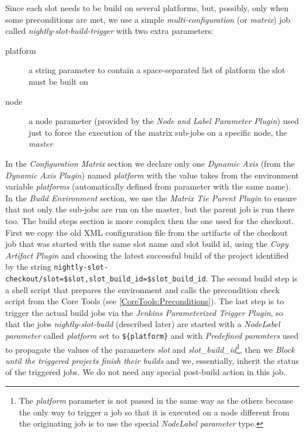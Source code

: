 \documentclass{lhcbnote}
\begin{document}
Since each slot needs to be build on several platforms, but, possibly, only when
some preconditions are met, we use a simple \emph{multi-configuration} (or
\emph{matrix}) job called \emph{nightly-slot-build-trigger} with two extra
parameters:
\begin{description}
  \item[platform] a string parameter to contain a space-separated list of
platform the slot must be built on
  \item[node] a node parameter (provided by the \emph{Node and Label Parameter
Plugin}) used just to force the execution of the matrix sub-jobs on a specific
node, the \emph{master}
\end{description}
In the \emph{Configuration Matrix} section we declare only one \emph{Dynamic
Axis} (from the \emph{Dynamic Axis Plugin}) named \emph{platform} with the value
takes from the environment variable \emph{platforms} (automatically defined from
parameter with the same name).  In the \emph{Build Environment} section, we use
the \emph{Matrix Tie Parent Plugin} to ensure that not only the sub-jobs are run
on the master, but the parent job is run there too.  The build steps section is
more complex then the one used for the checkout.  First we copy the old XML
configuration file from the artifacts of the checkout job that was started with
the same slot name and slot build id, using the \emph{Copy Artifact Plugin} and
choosing the latest successful build of the project identified by the string
\verb|nightly-slot-checkout/slot=$slot,slot_build_id=$slot_build_id|.  The
second build step is a shell script that prepares the environment and calls the
precondition check script from the Core Tools (see
\ref{CoreTools:Preconditions}).  The last step is to trigger the actual build
jobs via the \emph{Jenkins Parameterized Trigger Plugin}, so that the jobs
\emph{nightly-slot-build} (described later) are started with a \emph{NodeLabel
parameter} called \emph{platform} set to \verb|${platform}| and with
\emph{Predefined paramters} used to propagate the values of the parameters
\emph{slot} and \emph{slot\_build\_id}\footnote{The \emph{platform} parameter is
  not passed in the same way as the others because the only way to trigger a job
  so that it is executed on a node different from the originating job is to use
  the special \emph{NodeLabel parameter} type.},
then we \emph{Block until the triggered projects finish their builds} and we,
essentially, inherit the status of the triggered jobs.  We do not need any
special post-build action in this job.
\end{document}
